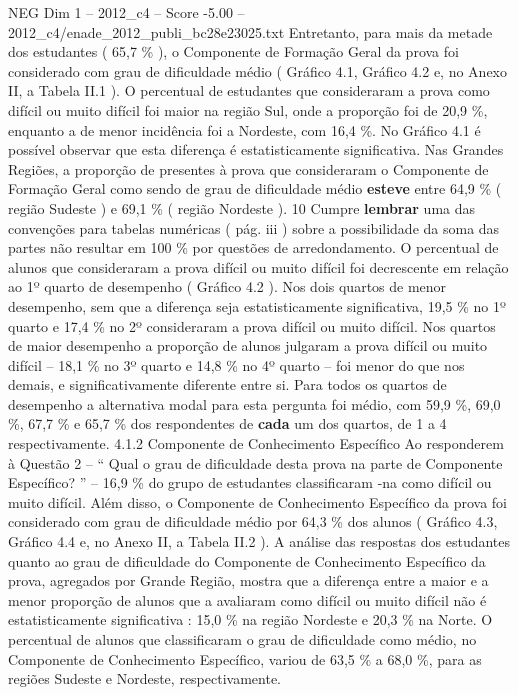 \begin{textsample}{NEG Dim 1 – 2012\_c4 – Score -5.00 – 2012\_c4/enade\_2012\_publi\_bc28e23025.txt}
Entretanto, para mais da metade dos estudantes ( 65,7 \% ), o Componente de Formação Geral da prova foi considerado com grau de dificuldade médio ( Gráfico 4.1, Gráfico 4.2 e, no Anexo II, a Tabela II.1 ).
O percentual de estudantes que consideraram a prova como difícil ou muito difícil foi maior na região Sul, onde a proporção foi de 20,9 \%, enquanto a de menor incidência foi a Nordeste, com 16,4 \%.
No Gráfico 4.1 é possível observar que esta diferença é estatisticamente significativa.
Nas Grandes Regiões, a proporção de presentes à prova que consideraram o Componente de Formação Geral como sendo de grau de dificuldade médio \textbf{esteve} entre 64,9 \% ( região Sudeste ) e 69,1 \% ( região Nordeste ). 10 Cumpre \textbf{lembrar} uma das convenções para tabelas numéricas ( pág. iii ) sobre a possibilidade da soma das partes não resultar em 100 \% por questões de arredondamento.
O percentual de alunos que consideraram a prova difícil ou muito difícil foi decrescente em relação ao 1º quarto de desempenho ( Gráfico 4.2 ).
Nos dois quartos de menor desempenho, sem que a diferença seja estatisticamente significativa, 19,5 \% no 1º quarto e 17,4 \% no 2º consideraram a prova difícil ou muito difícil.
Nos quartos de maior desempenho a proporção de alunos julgaram a prova difícil ou muito difícil – 18,1 \% no 3º quarto e 14,8 \% no 4º quarto – foi menor do que nos demais, e significativamente diferente entre si.
Para todos os quartos de desempenho a alternativa modal para esta pergunta foi médio, com 59,9 \%, 69,0 \%, 67,7 \% e 65,7 \% dos respondentes de \textbf{cada} um dos quartos, de 1 a 4 respectivamente. 4.1.2 Componente de Conhecimento Específico Ao responderem à Questão 2 – “ Qual o grau de dificuldade desta prova na parte de Componente Específico? ” – 16,9 \% do grupo de estudantes classificaram -na como difícil ou muito difícil.
Além disso, o Componente de Conhecimento Específico da prova foi considerado com grau de dificuldade médio por 64,3 \% dos alunos ( Gráfico 4.3, Gráfico 4.4 e, no Anexo II, a Tabela II.2 ).
A análise das respostas dos estudantes quanto ao grau de dificuldade do Componente de Conhecimento Específico da prova, agregados por Grande Região, mostra que a diferença entre a maior e a menor proporção de alunos que a avaliaram como difícil ou muito difícil não é estatisticamente significativa : 15,0 \% na região Nordeste e 20,3 \% na Norte.
O percentual de alunos que classificaram o grau de dificuldade como médio, no Componente de Conhecimento Específico, variou de 63,5 \% a 68,0 \%, para as regiões Sudeste e Nordeste, respectivamente.

\end{textsample}
